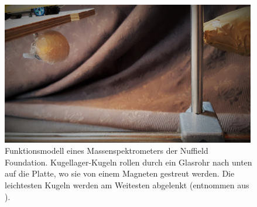 \begin{figure}[htbp]
\centering
 \includegraphics[width=0.99\textwidth]{images/stroemungskraftmessung2.jpg}
  \caption[Analogieversuch zu Massenspektrometrie nach \textsc{Luchner}, \textsc{Degner} und \textsc{Schilling} ]{Funktionsmodell eines Massenspektrometers der Nuffield Foundation. Kugellager-Kugeln rollen durch ein Glasrohr nach unten auf die Platte, wo sie von einem Magneten gestreut werden. Die leichtesten Kugeln werden am Weitesten abgelenkt (entnommen aus \cite[S\,262]{Nuffield1970}).}
  \label{fig:stroemungskraftmessung2}
  \vspace{-0pt}
\end{figure}